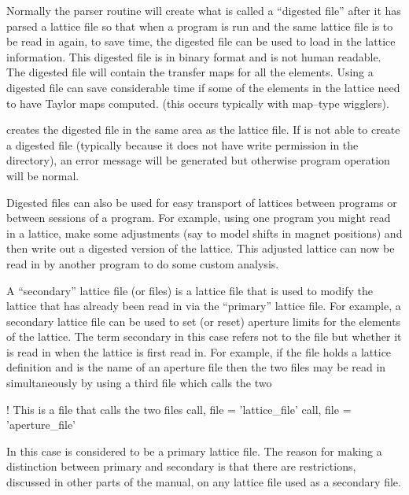 Normally the \bmad parser routine will create what is called a
``digested file'' after it has parsed a lattice file so that when a
program is run and the same lattice file is to be read in again, to save
time, the digested file can be used to load in the lattice information.
This digested file is in binary format and is not human readable. The
digested file will contain the transfer maps for all the elements. 
Using a digested file can save considerable time if some of the
elements in the lattice need to have Taylor maps computed.
(this occurs typically with map--type wigglers).

\bmad creates the digested file in the same area as the lattice file.
If \bmad is not able to create a digested file (typically because it
does not have write permission in the directory), an error message will
be generated but otherwise program operation will be normal.

Digested files can also be used for easy transport of lattices between
programs or between sessions of a program. For example, using one
program you might read in a lattice, make some adjustments (say to model
shifts in magnet positions) and then write out a digested version of the
lattice. This adjusted lattice can now be read in by another program to
do some custom analysis.

A ``secondary'' lattice file (or files) is a lattice file that is used
to modify the lattice that has already been read in via the
``primary'' lattice file.  For example, a secondary lattice file can
be used to set (or reset) aperture limits for the elements of the
lattice.  The term secondary in this case refers not to the file but
whether it is read in when the lattice is first read in. For example,
if the file  holds a lattice definition and
 is the name of an aperture file then the two files
may be read in simultaneously by using a third file which calls the
two
\begin{example}
  ! This is a file that calls the two files
  call, file = 'lattice_file'
  call, file = 'aperture_file'
\end{example}
In this case  is considered to be a
primary lattice file.  The reason for making a distinction between
primary and secondary is that there are restrictions, discussed in
other parts of the manual, on any lattice file used as a secondary
file.


